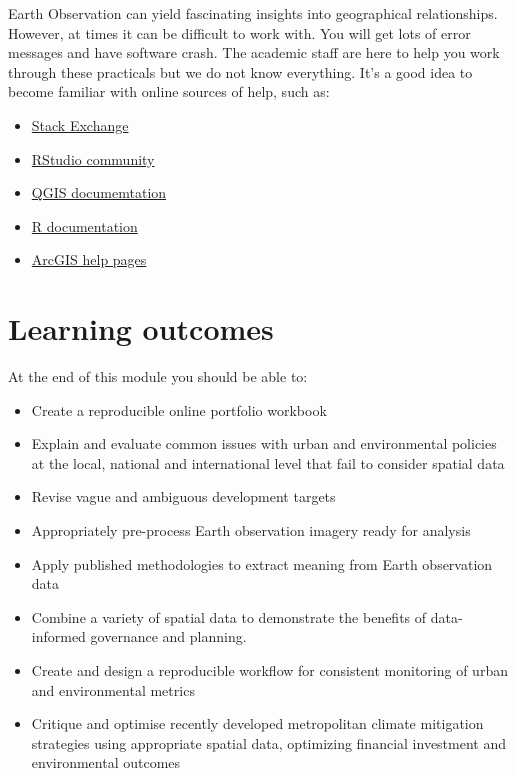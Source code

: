 \documentclass[
]{book}
\providecommand{\tightlist}{%
  \setlength{\itemsep}{0pt}\setlength{\parskip}{0pt}}
\begin{document}
Earth Observation can yield fascinating insights into geographical relationships. However, at times it can be difficult to work with. You will get lots of error messages and have software crash. The academic staff are here to help you work through these practicals but we do not know everything. It's a good idea to become familiar with online sources of help, such as:

\begin{itemize}
\tightlist
\item
  \href{https://stackexchange.com/}{Stack Exchange}
\item
  \href{https://community.rstudio.com/}{RStudio community}
\item
  \href{https://docs.qgis.org/3.4/en/docs/index.html}{QGIS documemtation}
\item
  \href{https://www.rdocumentation.org/}{R documentation}
\item
  \href{https://support.esri.com/en}{ArcGIS help pages}
\end{itemize}

\hypertarget{learning-outcomes}{%
\section*{Learning outcomes}\label{learning-outcomes}}

At the end of this module you should be able to:

\begin{itemize}
\item
  Create a reproducible online portfolio workbook
\item
  Explain and evaluate common issues with urban and environmental policies at the local, national and international level that fail to consider spatial data
\item
  Revise vague and ambiguous development targets
\item
  Appropriately pre-process Earth observation imagery ready for analysis
\item
  Apply published methodologies to extract meaning from Earth observation data
\item
  Combine a variety of spatial data to demonstrate the benefits of data-informed governance and planning.
\item
  Create and design a reproducible workflow for consistent monitoring of urban and environmental metrics
\item
  Critique and optimise recently developed metropolitan climate mitigation strategies using appropriate spatial data, optimizing financial investment and environmental outcomes
\end{itemize}
\end{document}
